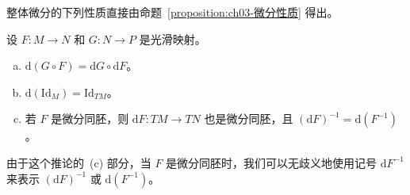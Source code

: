 \documentclass[../../main.tex]{subfiles}
\begin{document}
整体微分的下列性质直接由命题~\cref{proposition:ch03-微分性质} 得出。

\begin{corollary}[整体微分的性质]\label{corollary:ch03-整体微分性质}
设 $F:M\to N$ 和 $G:N\to P$ 是光滑映射。
\begin{enumerate}[(a)]
\item $\mathrm{d}(G\circ F)=\mathrm{d}G\circ\mathrm{d}F$。
\item $\mathrm{d}(\mathrm{Id}_{M})=\mathrm{Id}_{TM}$。
\item 若 $F$ 是微分同胚，则 $\mathrm{d}F:TM\to TN$ 也是微分同胚，且 $(\mathrm{d}F)^{-1}=\mathrm{d}(F^{-1})$。
\end{enumerate}
\end{corollary}

由于这个推论的~(c) 部分，当 $F$ 是微分同胚时，我们可以无歧义地使用记号 $\mathrm{d}F^{-1}$ 来表示 $(\mathrm{d}F)^{-1}$ 或 $\mathrm{d}(F^{-1})$。
\end{document}
